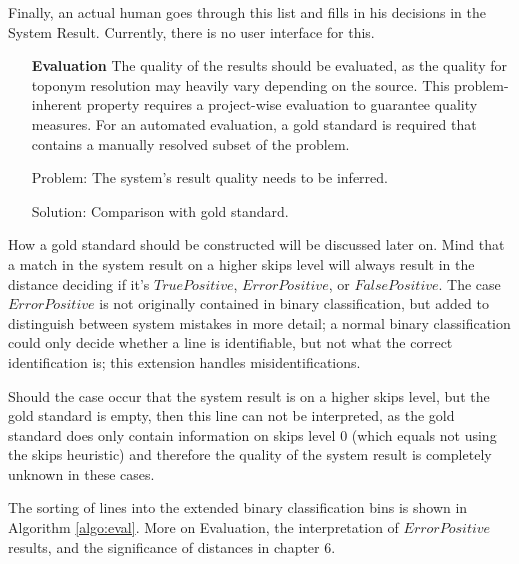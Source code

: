 \documentclass[11pt]{article}
\begin{document}
Finally, an actual human goes through this list and fills in his decisions in the System Result. Currently, there is no user interface for this.

\newpage

\begin{itemize}
\item[\textbf{Evaluation}] The quality of the results should be evaluated, as the quality for toponym resolution may heavily vary depending on the source. \cite{buscaldi11} This problem-inherent property requires a project-wise evaluation to guarantee quality measures. For an automated evaluation, a gold standard is required that contains a manually resolved subset of the problem.
\item[Problem:] The system's result quality needs to be inferred.
\item[Solution:] Comparison with gold standard.
\end{itemize}
 
 How a gold standard should be constructed will be discussed later on. Mind that a match in the system result on a higher skips level will always result in the distance deciding if it's $TruePositive$, $ErrorPositive$, or $False Positive$. The case $ErrorPositive$ is not originally contained in binary classification, but added to distinguish between system mistakes in more detail; a normal binary classification could only decide whether a line is identifiable, but not what the correct identification is; this extension handles misidentifications.
 
Should the case occur that the system result is on a higher skips level, but the gold standard is empty, then this line can not be interpreted, as the gold standard does only contain information on skips level 0 (which equals not using the skips heuristic) and therefore the quality of the system result is completely unknown in these cases.

The sorting of lines into the extended binary classification bins is shown in Algorithm \ref{algo:eval}. More on Evaluation, the interpretation of $Error Positive$ results, and the significance of distances in chapter 6. \\
\end{document}
